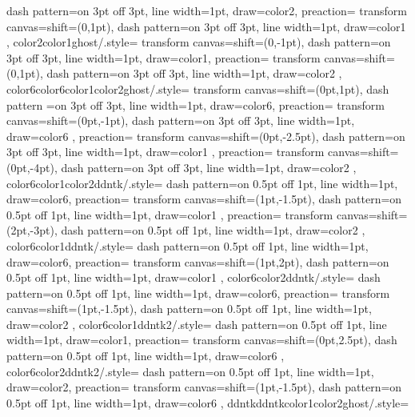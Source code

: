 {{    dash pattern=on 3pt off 3pt,
    line width=1pt,
    draw=color2,
    preaction={
      transform canvas={shift={(0,1pt)}},
      dash pattern=on 3pt off 3pt,
      line width=1pt,
      draw=color1
     }
    },
    color2color1ghost/.style={
    transform canvas={shift={(0,-1pt)}},
    dash pattern=on 3pt off 3pt,
    line width=1pt,
    draw=color1,
    preaction={
      transform canvas={shift={(0,1pt)}},
      dash pattern=on 3pt off 3pt,
      line width=1pt,
      draw=color2
    }
    },
    color6color6color1color2ghost/.style={
    transform canvas={shift={(0pt,1pt)}},
    dash pattern =on 3pt off 3pt,
    line width=1pt,
    draw=color6,
    preaction={
      transform canvas={shift={(0pt,-1pt)}},
      dash pattern=on 3pt off 3pt,
      line width=1pt,
      draw=color6
      },
    preaction={
      transform canvas={shift={(0pt,-2.5pt)}},
      dash pattern=on 3pt off 3pt,
      line width=1pt,
      draw=color1
      },
    preaction={
      transform canvas={shift={(0pt,-4pt)}},
      dash pattern=on 3pt off 3pt,
      line width=1pt,
      draw=color2
      }
    },
    color6color1color2ddntk/.style={
    dash pattern=on 0.5pt off 1pt,
    line width=1pt,
    draw=color6,
    preaction={
      transform canvas={shift={(1pt,-1.5pt)}},
      dash pattern=on 0.5pt off 1pt,
      line width=1pt,
      draw=color1
     },
    preaction={
      transform canvas={shift={(2pt,-3pt)}},
      dash pattern=on 0.5pt off 1pt,
      line width=1pt,
      draw=color2
      }  
    },
    color6color1ddntk/.style={
    dash pattern=on 0.5pt off 1pt,
    line width=1pt,
    draw=color6,
      preaction={
      transform canvas={shift={(1pt,2pt)}},
      dash pattern=on 0.5pt off 1pt,
      line width=1pt,
      draw=color1
      }  
    },    
    color6color2ddntk/.style={
    dash pattern=on 0.5pt off 1pt,
    line width=1pt,
    draw=color6,
      preaction={
      transform canvas={shift={(1pt,-1.5pt)}},
      dash pattern=on 0.5pt off 1pt,
      line width=1pt,
      draw=color2
      }  
    },
    color6color1ddntk2/.style={
    dash pattern=on 0.5pt off 1pt,
    line width=1pt,
    draw=color1,
      preaction={
      transform canvas={shift={(0pt,2.5pt)}},
      dash pattern=on 0.5pt off 1pt,
      line width=1pt,
      draw=color6
      }  
    },
    color6color2ddntk2/.style={
    dash pattern=on 0.5pt off 1pt,
    line width=1pt,
    draw=color2,
      preaction={
      transform canvas={shift={(1pt,-1.5pt)}},
      dash pattern=on 0.5pt off 1pt,
      line width=1pt,
      draw=color6
      }  
    },
    ddntkddntkcolor1color2ghost/.style={
}}
